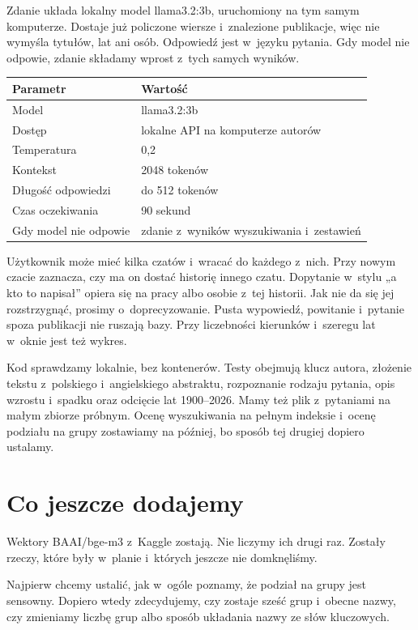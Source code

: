 \documentclass[11pt,a4paper]{article}
\begin{document}
Zdanie układa lokalny model llama3.2:3b, uruchomiony na tym samym komputerze. Dostaje już policzone wiersze i~znalezione publikacje, więc nie wymyśla tytułów, lat ani osób. Odpowiedź jest w~języku pytania. Gdy model nie odpowie, zdanie składamy wprost z~tych samych wyników.

\begin{center}
\begin{tabularx}{\textwidth}{|L{0.36\textwidth}|Y|}
\hline
\textbf{Parametr} & \textbf{Wartość} \\
\hline
Model & llama3.2:3b \\
\hline
Dostęp & lokalne API na komputerze autorów \\
\hline
Temperatura & 0,2 \\
\hline
Kontekst & 2048 tokenów \\
\hline
Długość odpowiedzi & do 512 tokenów \\
\hline
Czas oczekiwania & 90 sekund \\
\hline
Gdy model nie odpowie & zdanie z~wyników wyszukiwania i~zestawień \\
\hline
\end{tabularx}
\end{center}

Użytkownik może mieć kilka czatów i~wracać do każdego z~nich. Przy nowym czacie zaznacza, czy ma on dostać historię innego czatu. Dopytanie w~stylu „a kto to napisał” opiera się na pracy albo osobie z~tej historii. Jak nie da się jej rozstrzygnąć, prosimy o~doprecyzowanie. Pusta wypowiedź, powitanie i~pytanie spoza publikacji nie ruszają bazy. Przy liczebności kierunków i~szeregu lat w~oknie jest też wykres.

Kod sprawdzamy lokalnie, bez kontenerów. Testy obejmują klucz autora, złożenie tekstu z~polskiego i~angielskiego abstraktu, rozpoznanie rodzaju pytania, opis wzrostu i~spadku oraz odcięcie lat 1900--2026. Mamy też plik z~pytaniami na małym zbiorze próbnym. Ocenę wyszukiwania na pełnym indeksie i~ocenę podziału na grupy zostawiamy na później, bo sposób tej drugiej dopiero ustalamy.

\section*{Co jeszcze dodajemy}

Wektory BAAI/bge-m3 z~Kaggle zostają. Nie liczymy ich drugi raz. Zostały rzeczy, które były w~planie i~których jeszcze nie domknęliśmy.

Najpierw chcemy ustalić, jak w~ogóle poznamy, że podział na grupy jest sensowny. Dopiero wtedy zdecydujemy, czy zostaje sześć grup i~obecne nazwy, czy zmieniamy liczbę grup albo sposób układania nazwy ze słów kluczowych.
\end{document}
